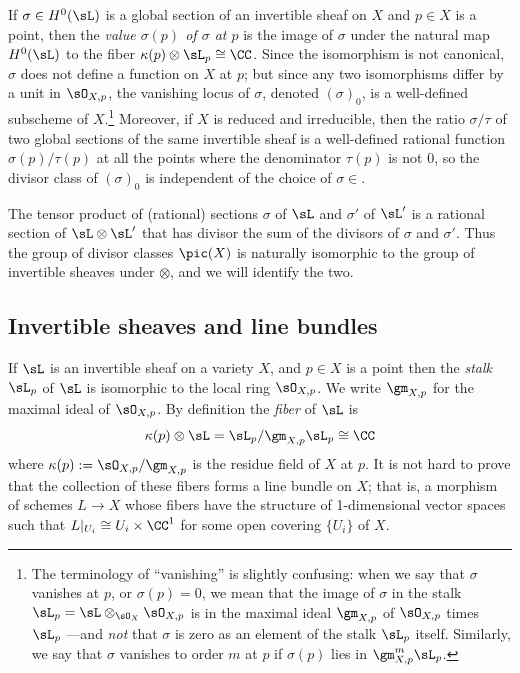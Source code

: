 
If $\sigma\in H^0(\sL)$ is a global section of an invertible sheaf on $X$ and $p\in X$ is a point, then the \emph{value $\sigma(p)$ of $\sigma$ at $p$} is the image  of $\sigma$ under the natural map $H^0(\sL)$ to the fiber $\kappa(p) \otimes \sL_{p} \cong \CC$.
Since the isomorphism is not canonical, $\sigma$ does not define a function on $X$ at $p$; but since any two isomorphisms
differ by a unit in $\sO_{X,p}$, the vanishing locus of $\sigma$, denoted $(\sigma)_0$, is a well-defined subscheme of $X$.\footnote{The terminology of ``vanishing'' is slightly confusing: when we  say that $\sigma$ vanishes at $p$, or $\sigma(p) = 0$, we mean that the image of $\sigma$ in the stalk $\sL_p = \sL \otimes_{\sO_{X}} \sO_{X,p}$ is in 
the maximal ideal $\gm_{X,p}$ of $\sO_{X,p}$ times $\sL_p$
---and \emph{not} that $\sigma$ is zero
as an element of the stalk $\sL_p$ itself. Similarly, we say that $\sigma$ vanishes to order $m$ at $p$ if $\sigma(p)$ lies in $\gm_{X,p}^m\sL_p$. }
 Moreover, if $X$ is reduced and irreducible, then the ratio $\sigma/\tau$ of two global sections
 of the same invertible sheaf is a well-defined rational function
$\sigma(p)/\tau(p)$ at all the points where the denominator $\tau(p)$ is not 0, so the divisor class of 
$(\sigma)_0$ is independent of the choice of $\sigma \in $.

The tensor product of (rational) sections $\sigma$ of $\sL$ and $\sigma'$
of $\sL'$ is a rational section of $\sL \otimes \sL'$ that has divisor the sum of the divisors of $\sigma$ and 
$\sigma'$. Thus the group of divisor classes $\pic(X)$ is naturally isomorphic to the group of invertible
sheaves under $\otimes$, and we will identify the two.



\subsection{Invertible sheaves and line bundles}

If $\sL$ is an invertible sheaf on a variety $X$, and $p\in X$ is a point then the \emph{stalk} $\sL_p$ of $\sL$ is isomorphic to the local
ring $\sO_{X,p}$. We write $\gm_{X,p}$ for the maximal ideal of $\sO_{X,p}$. By definition the \emph{fiber} of $\sL$ is 
$$
\kappa(p) \otimes \sL =\sL_p/\gm_{X,p}\sL_p\cong \CC
$$
where $\kappa(p) := \sO_{X,p}/\gm_{X,p}$ is the residue field of $X$ at $p$.
It is not hard to prove that the collection of these fibers forms a line bundle on $X$; that is,
a morphism of schemes $L \to X$ whose fibers have the structure of 1-dimensional vector spaces
such that $L|_{U_{i}} \cong U_{i}\times \CC^{1}$ for some open covering $\{U_{i}\}$ of $X$.

